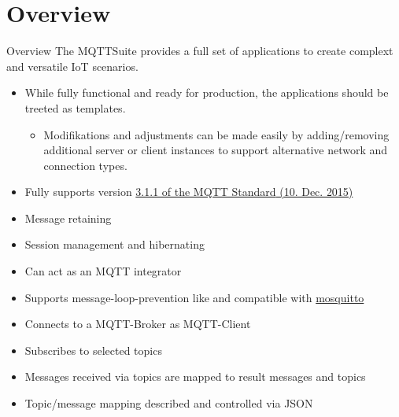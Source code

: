 ﻿\part[nopartpage]{Overview}

\begin{frame}{Overview}
    The \alert{MQTTSuite} provides a full \alert{set of applications} to create complext and versatile \alert{IoT scenarios}.
    \begin{itemize}
        \item While \alert{fully functional} and \alert{ready for production}, the applications should be \alert{treeted as templates}.
        \begin{itemize}
            \item \alert{Modifikations} and \alert{adjustments} can be made easily by \alert{adding/removing} additional \alert{server or client} instances to support \alert{alternative network and connection} types.
    \end{itemize}
    \end{itemize}
    \begin{description}[MQTTIntegrator]
        \item [MQTTBroker]
        \begin{itemize}
            \item Fully supports version \href{https://docs.oasis-open.org/mqtt/mqtt/v3.1.1/mqtt-v3.1.1.html}{\textcolor{fh-ooe-red}{3.1.1 of the MQTT Standard} (10. Dec. 2015)}
            \item Message \alert{retaining}
            \item Session \alert{management} and \alert{hibernating}
            \item Can \alert{act as} an MQTT \alert{integrator}
            \item Supports \alert{message-loop-prevention} like and compatible with \href{https://mosquitto.org/}{\textcolor{fh-ooe-red}{mosquitto}}
        \end{itemize}
        \item [MQTTIntegrator]
        \begin{itemize}
            \item Connects to a MQTT-Broker as MQTT-Client
            \item \alert{Subscribes} to selected \alert{topics}
            \item \alert{Messages} received via \alert{topics} are \alert{mapped} to \alert{result messages and topics}
            \item Topic/message \alert{mapping described} and controlled \alert{via JSON}

\end{itemize}
\end{description}
\end{frame}
